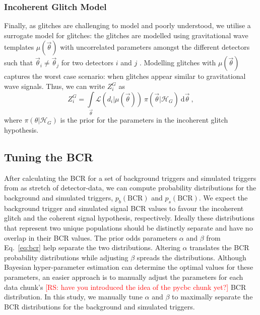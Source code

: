 \documentclass[%
preprint,
 amsmath,amssymb,
 aps,
]{revtex4}
\newcommand{\bcr}{{\sc BCR}\xspace}
\newcommand{\template}{{\sc $\mu(\vec{\theta})$}\xspace}
\newcommand{\rs}[1]{\textcolor{red}{[RS: #1]}}
\begin{document}
\subsubsection{Incoherent Glitch Model}
Finally, as glitches are challenging to model and poorly understood, we utilise a surrogate model for glitches: the glitches are modelled using gravitational wave templates  \template with uncorrelated  parameters amongst the different detectors such that  $\vec{\theta}_i \neq \vec{\theta}_j$ for two detectors $i$ and $j$ \cite{bci}.  Modelling glitches with \template captures the worst case scenario: when glitches appear similar to gravitational wave signals. Thus, we can write $Z^G_i$ as 
\begin{equation}
\label{eq:zg}
Z^G_i = \int\limits_{\vec{\theta}} \mathcal{L}(d_i|\mu(\vec{\theta}))\ \pi(\vec{\theta}| \mathcal{H}_G)\  \text{d}\vec{\theta}  \ ,
\end{equation}
where $\pi(\theta| \mathcal{H}_G)$ is the prior for the parameters in the incoherent glitch hypothesis. 

\subsection{Tuning the BCR}

After calculating the \bcr for a set of background triggers and simulated triggers from as stretch of detector-data, we can compute probability distributions for the background and simulated triggers, $p_b(\text{BCR})$ and $p_s(\text{BCR})$. We expect the background trigger and simulated signal \bcr values to favour the incoherent glitch and the coherent signal hypothesis, respectively. Ideally these distributions that represent two unique populations should be distinctly separate and have no overlap in their \bcr values. The prior odds parameters $\alpha$ and $\beta$ from Eq.~\ref{eq:bcr} help separate the two distributions. Altering $\alpha$ translates the \bcr probability distributions while adjusting $\beta$ spreads the distributions. Although Bayesian hyper-parameter estimation can determine the optimal values for these parameters, an easier approach is to manually adjust the parameters for each data chunk's \rs{have you introduced the idea of the pycbc chunk yet?}  \bcr distribution. In this study, we manually tune $\alpha$ and $\beta$ to maximally separate the \bcr distributions for the background and simulated triggers. \\
\end{document}
